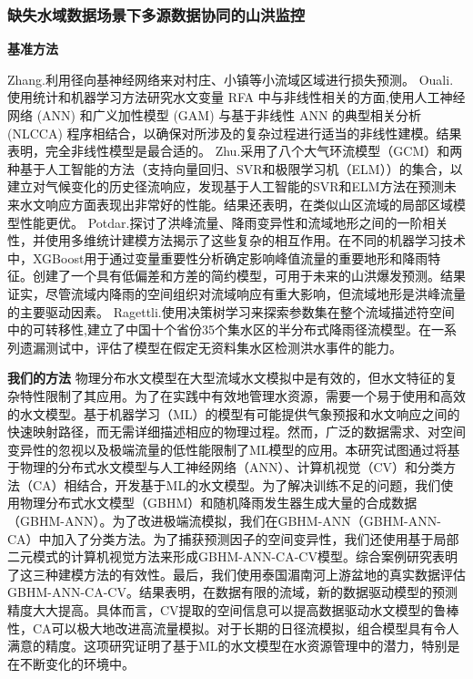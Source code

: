 \documentclass{ctexart}
\begin{document}
\subsubsection{缺失水域数据场景下多源数据协同的山洪监控}

\textbf{基准方法}

Zhang.\cite{zhang2021loss}利用径向基神经网络来对村庄、小镇等小流域区域进行损失预测。
Ouali.\cite{ouali2017fully}使用统计和机器学习方法研究水文变量 RFA 中与非线性相关的方面,使用人工神经网络 (ANN) 和广义加性模型 (GAM) 与基于非线性 ANN 的典型相关分析 (NLCCA) 程序相结合，以确保对所涉及的复杂过程进行适当的非线性建模。结果表明，完全非线性模型是最合适的。
Zhu.\cite{zhu2019hydrological}采用了八个大气环流模型（GCM）和两种基于人工智能的方法（支持向量回归、SVR和极限学习机（ELM））的集合，以建立对气候变化的历史径流响应，发现基于人工智能的SVR和ELM方法在预测未来水文响应方面表现出非常好的性能。结果还表明，在类似山区流域的局部区域模型性能更优。
Potdar.\cite{potdar2021toward}探讨了洪峰流量、降雨变异性和流域地形之间的一阶相关性，并使用多维统计建模方法揭示了这些复杂的相互作用。在不同的机器学习技术中，XGBoost用于通过变量重要性分析确定影响峰值流量的重要地形和降雨特征。创建了一个具有低偏差和方差的简约模型，可用于未来的山洪爆发预测。结果证实，尽管流域内降雨的空间组织对流域响应有重大影响，但流域地形是洪峰流量的主要驱动因素。
Ragettli.\cite{ragettli2017modeling}使用决策树学习来探索参数集在整个流域描述符空间中的可转移性,建立了中国十个省份35个集水区的半分布式降雨径流模型。在一系列遗漏测试中，评估了模型在假定无资料集水区检测洪水事件的能力。


\textbf{我们的方法}
\cite{yang2020physical}物理分布水文模型在大型流域水文模拟中是有效的，但水文特征的复杂特性限制了其应用。为了在实践中有效地管理水资源，需要一个易于使用和高效的水文模型。基于机器学习（ML）的模型有可能提供气象预报和水文响应之间的快速映射路径，而无需详细描述相应的物理过程。然而，广泛的数据需求、对空间变异性的忽视以及极端流量的低性能限制了ML模型的应用。本研究试图通过将基于物理的分布式水文模型与人工神经网络（ANN）、计算机视觉（CV）和分类方法（CA）相结合，开发基于ML的水文模型。为了解决训练不足的问题，我们使用物理分布式水文模型（GBHM）和随机降雨发生器生成大量的合成数据（GBHM-ANN）。为了改进极端流模拟，我们在GBHM-ANN（GBHM-ANN-CA）中加入了分类方法。为了捕获预测因子的空间变异性，我们还使用基于局部二元模式的计算机视觉方法来形成GBHM-ANN-CA-CV模型。综合案例研究表明了这三种建模方法的有效性。最后，我们使用泰国湄南河上游盆地的真实数据评估GBHM-ANN-CA-CV。结果表明，在数据有限的流域，新的数据驱动模型的预测精度大大提高。具体而言，CV提取的空间信息可以提高数据驱动水文模型的鲁棒性，CA可以极大地改进高流量模拟。对于长期的日径流模拟，组合模型具有令人满意的精度。这项研究证明了基于ML的水文模型在水资源管理中的潜力，特别是在不断变化的环境中。
\end{document}
